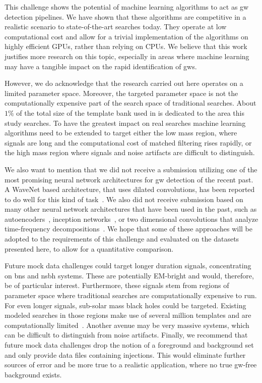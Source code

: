 This challenge shows the potential of machine learning algorithms to act as \acrshort{gw} detection pipelines. We have shown that these algorithms are competitive in a realistic scenario to state-of-the-art searches today. They operate at low computational cost and allow for a trivial implementation of the algorithms on highly efficient GPUs, rather than relying on CPUs. We believe that this work justifies more research on this topic, especially in areas where machine learning may have a tangible impact on the rapid identification of \acrshort{gw}s.

However, we do acknowledge that the research carried out here operates on a limited parameter space. Moreover, the targeted parameter space is not the computationally expensive part of the search space of traditional searches. About $1\%$ of the total size of the template bank used in \cite{Nitz:2021zwj} is dedicated to the area this study searches. To have the greatest impact on real searches machine learning algorithms need to be extended to target either the low mass region, where signals are long and the computational cost of matched filtering rises rapidly, or the high mass region where signals and noise artifacts are difficult to distinguish.

We also want to mention that we did not receive a submission utilizing one of the most promising neural network architectures for \acrshort{gw} detection of the recent past. A WaveNet based architecture, that uses dilated convolutions, has been reported to do well for this kind of task~\cite{Gebhard:2019ldz, Schmitt:2019aaa, Wei:2020ztw}. We also did not receive submission based on many other neural network architectures that have been used in the past, such as autoencoders~\cite{Shen:2019ohi, Morawski:2021kxv, Moreno:2021fvp, Bacon:2022lsm}, inception networks~\cite{Dreissigacker:2020xfr, Schafer:2020kor}, or two dimensional convolutions that analyze time-frequency decompositions~\cite{Wei:2020sfz}. We hope that some of these approaches will be adopted to the requirements of this challenge and evaluated on the datasets presented here, to allow for a quantitative comparison.

Future mock data challenges could target longer duration signals, concentrating on \acrshort{bns} and \acrshort{nsbh} systems. These are potentially EM-bright and would, therefore, be of particular interest. Furthermore, these signals stem from regions of parameter space where traditional searches are computationally expensive to run. For even longer signals, sub-solar mass black holes could be targeted. Existing modeled searches in those regions make use of several million templates and are computationally limited~\cite{Nitz:2022ltl}. Another avenue may be very massive systems, which can be difficult to distinguish from noise artifacts. Finally, we recommend that future mock data challenges drop the notion of a foreground and background set and only provide data files containing injections. This would eliminate further sources of error and be more true to a realistic application, where no true \acrshort{gw}-free background exists.

